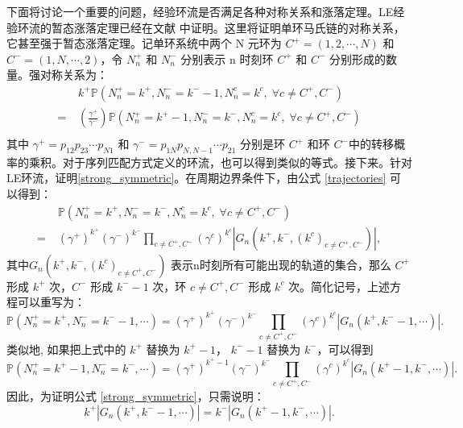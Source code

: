 
下面将讨论一个重要的问题，经验环流是否满足各种对称关系和涨落定理。LE经验环流的暂态涨落定理已经在文献 \cite{andrieux2007network} 中证明。这里将证明单环马氏链的对称关系，它甚至强于暂态涨落定理。记单环系统中两个 N 元环为  $C^+ = (1,2,\cdots,N)$ 和 $C^- = (1,N,\cdots,2)$，令 $N^+_n$ 和 $N^-_n$ 分别表示 n 时刻环  $C^+$ 和 $C^-$ 分别形成的数量。强对称关系为：
\begin{align} \label{strong_symmetric}
    &\;k^+ \mathbb{P}\left(N^+_n=k^+,N^-_n=k^- -1,N^c_n=k^c,\;\forall c\neq C^+,C^-\right)\\
    =&\; \left(\frac{\gamma^+}{\gamma^-}\right)\mathbb{P}\left(N^+_n=k^+ -1,N^-_n=k^-,N^c_n=k^c,\;\forall c\neq C^+,C^-\right)\\
\end{align}
其中 $\gamma^+ = p_{12}p_{23}\cdots p_{N1}$ 和 $\gamma^- = p_{1N}p_{N,N-1}\cdots p_{21}$ 分别是环 $C^+$ 和环 $C^-$中的转移概率的乘积。对于序列匹配方式定义的环流，也可以得到类似的等式\cite{pietzonka2021cycle}。接下来。针对LE环流，证明\ref{strong_symmetric}。在周期边界条件下，由公式 \eqref{trajectories} 可以得到：
\begin{align*}
    &\;\mathbb{P}\left(N^+_n=k^+,N^-_n=k^-,N^c_n=k^c,\;\forall c\neq C^+,C^-\right)\\
    =&\; (\gamma^+)^{k^+}(\gamma^-)^{k^-}\prod_{c\neq C^+,C^-}
    \left(\gamma^c\right)^{k^c}\left|G_n(k^+,k^-,(k^c)_{c\neq C^+,C^-})\right|,
\end{align*}
其中$G_n(k^+,k^-,(k^c)_{c\neq C^+,C^-})$ 表示n时刻所有可能出现的轨道的集合，那么 $C^+$ 形成 $k^+$ 次，$C^-$ 形成 $k^- -1$ 次，环 $c\neq C^+,C^-$ 形成 $k^c$ 次。简化记号，上述方程可以重写为：
\begin{equation}\label{temp1}
    \mathbb{P}\left(N^+_n=k^+,N^-_n=k^- -1,\cdots\right)
    = (\gamma^+)^{k^+}(\gamma^-)^{k^-}\prod_{c\neq C^+,C^-}\left(\gamma^c\right)^{k^c}|G_n(k^+,k^- -1,\cdots)|.
\end{equation}
类似地, 如果把上式中的 $k^+$ 替换为 $k^+ -1$， $k^- -1$ 替换为 $k^-$，可以得到
\begin{equation}\label{temp2}
\mathbb{P}\left(N^+_n=k^+ -1,N^-_n=k^-,\cdots\right)
= (\gamma^+)^{k^+ -1}(\gamma^-)^{k^-}\prod_{c\neq C^+,C^-}\left(\gamma^c\right)^{k^c}|G_n(k^+ -1,k^-,\cdots)|.
\end{equation}
因此，为证明公式 \ref{strong_symmetric}，只需说明：
\begin{equation} \label{equal0}
    k^+ |G_n(k^+, k^- -1, \cdots)| = k^-|G_n(k^+ -1,k^-,\cdots)|.
\end{equation}

